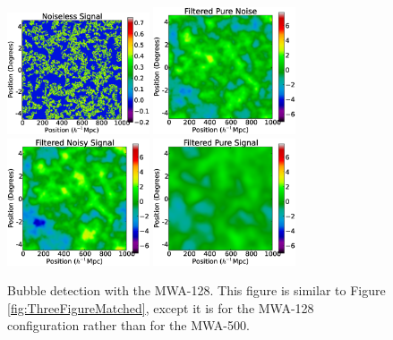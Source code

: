 \begin{figure}[h]
  \centering
  \includegraphics[width=4.2cm]{f11a.eps}
  \includegraphics[width=4.2cm]{f11b.eps}
  \includegraphics[width=4.2cm]{f11c.eps}
  \includegraphics[width=4.2cm]{f11d.eps}
  \caption{Bubble detection with the MWA-128. This figure is similar to Figure \ref{fig:ThreeFigureMatched}, except it is for the MWA-128 configuration rather
than for the MWA-500.}
  \label{fig:128tiles}
\end{figure}



